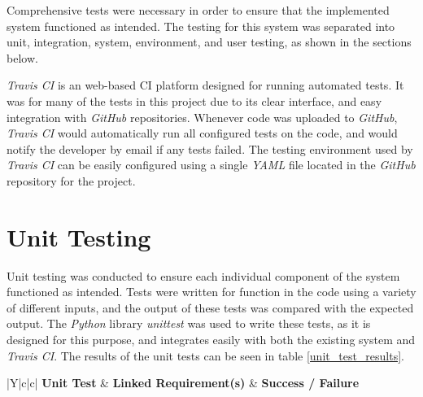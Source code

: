 %
%

Comprehensive tests were necessary in order to ensure that the implemented system functioned as intended.
The testing for this system was separated into unit, integration, system, environment, and user testing, as shown in the sections below.

\textit{Travis CI} \cite{travis_ci} is an web-based CI platform designed for running automated tests.
It was for many of the tests in this project due to its clear interface, and easy integration with \textit{GitHub} repositories.
Whenever code was uploaded to \textit{GitHub}, \textit{Travis CI} would automatically run all configured tests on the code, and would notify the developer by email if any tests failed.
The testing environment used by \textit{Travis CI} can be easily configured using a single \textit{YAML} \cite{yaml} file located in the \textit{GitHub} repository for the project.



\section{Unit Testing}
\label{unit_testing}
Unit testing was conducted to ensure each individual component of the system functioned as intended.
Tests were written for function in the code using a variety of different inputs, and the output of these tests was compared with the expected output.
The \textit{Python} library \textit{unittest} \cite{python_unittests} was used to write these tests, as it is designed for this purpose, and integrates easily with both the existing system and \textit{Travis CI}.
The results of the unit tests can be seen in table \ref{unit_test_results}.

\begin{table}[t]
  \caption{Results of Unit Tests}
  \begin{center}
    \begin{tabularx}{\textwidth}{|Y|c|c|} \hline
      \textbf{Unit Test} & \textbf{Linked Requirement(s)} & \textbf{Success / Failure} \\ \thickhline

    \end{tabularx}
  \end{center}
  \label{unit_test_results}
\end{table}

